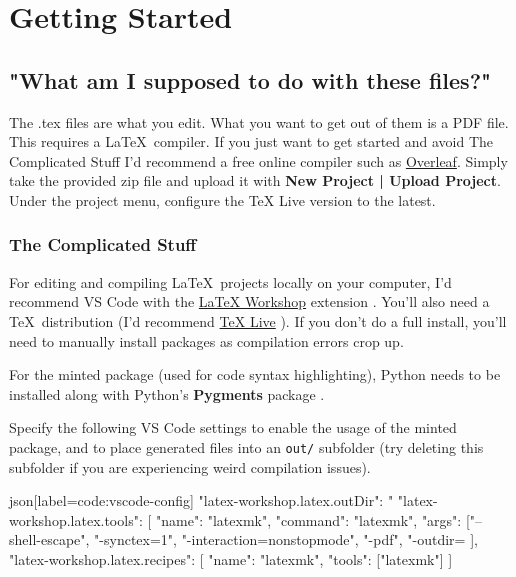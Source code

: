 \section{Getting Started}

\subsection{"What am I supposed to do with these files?"}

The .tex files are what you edit.
What you want to get out of them is a PDF file.
This requires a \LaTeX\ compiler.
If you just want to get started and avoid The Complicated Stuff I'd recommend a free online compiler such as \href{https://www.overleaf.com/}{Overleaf}.
Simply take the provided zip file and upload it with \textbf{New Project | Upload Project}.
Under the project menu, configure the TeX Live version to the latest.

\subsubsection{The Complicated Stuff}

For editing and compiling \LaTeX\ projects locally on your computer, I'd recommend VS Code with the \href{https://marketplace.visualstudio.com/items?itemName=James-Yu.latex-workshop}{LaTeX Workshop} extension \parencite{workshop}.
You'll also need a \TeX\ distribution (I'd recommend \href{https://www.tug.org/texlive/acquire-netinstall.html}{TeX Live} \parencite{texlive}).
If you don't do a full install, you'll need to manually install packages as compilation errors crop up.

For the minted package (used for code syntax highlighting), Python needs to be installed along with Python's \textbf{Pygments} package \parencite{pygmentize}.

Specify the following VS Code settings to enable the usage of the minted package, and to place generated files into an \texttt{out/} subfolder (try deleting this subfolder if you are experiencing weird compilation issues).
\begin{code}{json}[label=code:vscode-config]
"latex-workshop.latex.outDir": "%
"latex-workshop.latex.tools": [{
    "name": "latexmk",
    "command": "latexmk",
    "args": ["--shell-escape", "-synctex=1", "-interaction=nonstopmode", "-pdf", "-outdir=%
}],
"latex-workshop.latex.recipes": [{
    "name": "latexmk",
    "tools": ["latexmk"]
}]
\end{code}

